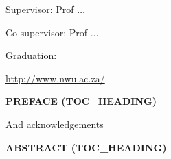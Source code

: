 \documentclass[12pt]{report}
\begin{document}
\vspace{\baselineskip}

\vspace{\baselineskip}
\begin{FlushLeft}
{\fontsize{16pt}{19.2pt}\selectfont Supervisor: \tabto{1.97in} Prof $ \ldots $ \par}
\end{FlushLeft}\par

\begin{FlushLeft}
{\fontsize{16pt}{19.2pt}\selectfont Co-supervisor: \tabto{1.97in} Prof $ \ldots $ \par}
\end{FlushLeft}\par


\vspace{\baselineskip}

\vspace{\baselineskip}
\begin{FlushLeft}
{\fontsize{16pt}{19.2pt}\selectfont Graduation: \par}
\end{FlushLeft}\par

\begin{FlushLeft}
\href{http://www.nwu.ac.za/}{http://www.nwu.ac.za/}
\end{FlushLeft}\par


\vspace{\baselineskip}

\vspace{\baselineskip}
\begin{FlushLeft}
{\fontsize{14pt}{16.8pt}\selectfont \textbf{\uppercase{Preface (TOC\_Heading)}}\par}
\end{FlushLeft}\par

And acknowledgements\par




\newpage

\vspace{\baselineskip}\begin{FlushLeft}
{\fontsize{14pt}{16.8pt}\selectfont \textbf{\uppercase{Abstract (TOC\_Heading)}}\par}
\end{FlushLeft}\par
\end{document}
